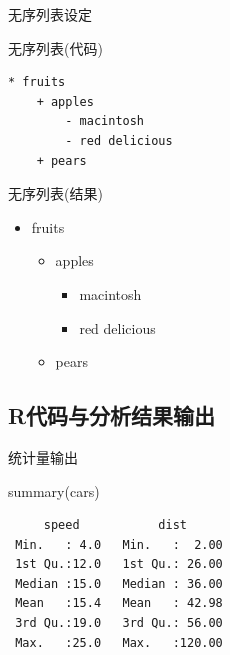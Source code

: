 \documentclass[
  12pt,
  ignorenonframetext,
  aspectratio=169, 12pt,table,t,utf-8]{beamer}
\newenvironment{Shaded}{\begin{snugshade}}{\end{snugshade}}
\newcommand{\FunctionTok}[1]{\textcolor[rgb]{0.00,0.00,0.00}{#1}}
\newcommand{\NormalTok}[1]{#1}
\providecommand{\tightlist}{%
  \setlength{\itemsep}{0pt}\setlength{\parskip}{0pt}}
\begin{document}
\begin{frame}[fragile]{无序列表设定}
\protect\hypertarget{ux65e0ux5e8fux5217ux8868ux8bbeux5b9a}{}
\begin{block}{无序列表(代码)}
\protect\hypertarget{ux65e0ux5e8fux5217ux8868ux4ee3ux7801}{}
\begin{verbatim}
* fruits
    + apples
        - macintosh
        - red delicious
    + pears
\end{verbatim}
\end{block}

\begin{block}{无序列表(结果)}
\protect\hypertarget{ux65e0ux5e8fux5217ux8868ux7ed3ux679c}{}
\begin{itemize}
\tightlist
\item
  fruits

  \begin{itemize}
  \tightlist
  \item
    apples

    \begin{itemize}
    \tightlist
    \item
      macintosh
    \item
      red delicious
    \end{itemize}
  \item
    pears
  \end{itemize}
\end{itemize}
\end{block}
\end{frame}

\hypertarget{rux4ee3ux7801ux4e0eux5206ux6790ux7ed3ux679cux8f93ux51fa}{%
\subsection{R代码与分析结果输出}\label{rux4ee3ux7801ux4e0eux5206ux6790ux7ed3ux679cux8f93ux51fa}}

\begin{frame}[fragile]{统计量输出}
\protect\hypertarget{ux7edfux8ba1ux91cfux8f93ux51fa}{}
\begin{Shaded}
\begin{Highlighting}[]
\FunctionTok{summary}\NormalTok{(cars)}
\end{Highlighting}
\end{Shaded}

\begin{verbatim}
     speed           dist       
 Min.   : 4.0   Min.   :  2.00  
 1st Qu.:12.0   1st Qu.: 26.00  
 Median :15.0   Median : 36.00  
 Mean   :15.4   Mean   : 42.98  
 3rd Qu.:19.0   3rd Qu.: 56.00  
 Max.   :25.0   Max.   :120.00  
\end{verbatim}
\end{frame}
\end{document}
